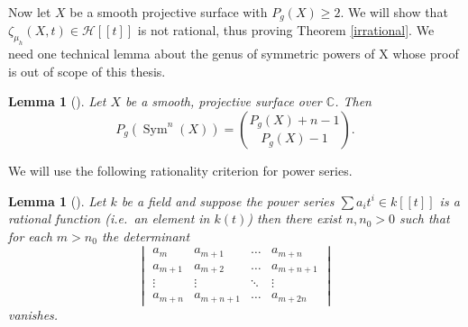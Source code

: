 \documentclass[11pt, a4paper, german, twoside]{article}
\theoremstyle{plain}
\newtheorem{lemma}[theorem]{Lemma}
\theoremstyle{definition}
\DeclareMathOperator{\Sym}{Sym}
\begin{document}
Now let $X$ be a smooth projective surface with $P_g(X) \geq 2$. We will show that $\zeta_{\mu_h}(X,t) \in \mathcal{H}[[t]]$ is not rational,
thus proving Theorem \ref{irrational}. We need one technical lemma about the genus of symmetric powers of X whose proof is out of scope of this
thesis.

\begin{lemma}[{\cite[Lem. 3.8]{MR1996804}}]
    \label{genus}
    Let $X$ be a smooth, projective surface over $\mathbb{C}$. Then
    \[
        P_g(\Sym^n(X)) = \binom{P_g(X) + n - 1}{P_g(X) - 1}.
    \]
\end{lemma}

We will use the following rationality criterion for power series.

\begin{lemma}[{\cite[Lem. 3.1]{bruhat}}]
    Let $k$ be a field and suppose the power series $\sum a_it^i \in k[[t]]$  is a rational function (i.e.\ an element in $k(t)$) then
    there exist $n, n_0 > 0$ such that for each $m > n_0$ the determinant
    \[
        \begin{vmatrix}
            a_m     & a_{m+1} & \dots & a_{m+n} \\
            a_{m+1} & a_{m+2} & \dots & a_{m+n+1} \\
            \vdots  & \vdots  & \ddots & \vdots \\
            a_{m+n} & a_{m+n+1} & \dots & a_{m+2n}
        \end{vmatrix}
    \]
    vanishes.
\end{lemma}
\end{document}

